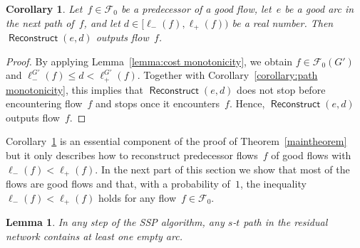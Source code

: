 \documentclass[11pt]{article}
\newtheorem{lemma}[theorem]{Lemma}
\newtheorem{corollary}[theorem]{Corollary}
\newcommand{\F}{\mathcal{F}}
\renewcommand{\sp}{\ell}
\DeclareMathOperator{\Reconstruct}{\mathsf{Reconstruct}}
\newcommand{\spm}[1][]{\sp^{#1}_{-}}
\newcommand{\spp}[1][]{\sp^{#1}_{+}}
\begin{document}
\begin{corollary}
\label{corollary:flow reconstruction}
Let~$f \in \F_0$ be a predecessor of a good flow, let~$e$ be a good arc in the next path of~$f$, and let $d \in \big[ \spm(f), \spp(f) \big)$ be a real number. Then $\Reconstruct(e, d)$ outputs flow~$f$.
\end{corollary}

\begin{proof}
By applying Lemma~\ref{lemma:cost monotonicity}, we obtain $f \in \F_0(G')$ and $\spm[G'](f) \leq d < \spp[G'](f)$. Together with Corollary~\ref{corollary:path monotonicity}, this implies that $\Reconstruct(e, d)$ does not stop before encountering flow~$f$ and stops once it encounters~$f$. Hence, $\Reconstruct(e, d)$ outputs flow~$f$. \end{proof}

Corollary~\ref{corollary:flow reconstruction} is an essential component of the proof of Theorem~\ref{maintheorem} but it only describes how to reconstruct predecessor flows~$f$ of good flows with $\spm(f) < \spp(f)$. In the next part of this section we show that
most of the flows are
good flows and that, with a probability of~$1$, the inequality $\spm(f) < \spp(f)$ holds for any flow~$f \in \F_0$.

\begin{lemma}
\label{lemma:one empty arc}
In any step of the SSP algorithm, any $s$-$t$ path in the residual network contains at least one empty arc.
\end{lemma}
\end{document}
